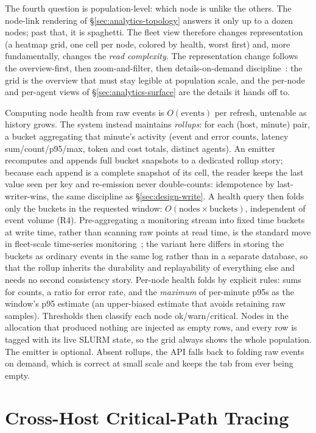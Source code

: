 The fourth question is population-level: which node is unlike the
others. The node-link rendering of \S\ref{sec:analytics-topology} answers
it only up to a dozen nodes; past that, it is spaghetti. The fleet view
therefore changes representation (a heatmap grid, one cell per node,
colored by health, worst first) and, more fundamentally, changes the
\emph{read complexity}. The representation change follows the
overview-first, then zoom-and-filter, then details-on-demand
discipline~\cite{shneiderman1996eyes}: the grid is the overview that must
stay legible at population scale, and the per-node and per-agent views of
\S\ref{sec:analytics-surface} are the details it hands off to.

Computing node health from raw events is $O(\text{events})$ per refresh,
untenable as history grows. The system instead maintains
\emph{rollups}: for each (host, minute) pair, a bucket aggregating that
minute's activity (event and error counts, latency sum/count/p95/max,
token and cost totals, distinct agents). An emitter recomputes and appends
full bucket snapshots to a dedicated rollup story; because each append is a
complete snapshot of its cell, the reader keeps the last value seen per key
and re-emission never double-counts: idempotence by
last-writer-wins, the same discipline as \S\ref{sec:design-write}. A
health query then folds only the buckets in the requested window:
$O(\text{nodes} \times \text{buckets})$, independent of event volume (R4).
Pre-aggregating a monitoring stream into fixed time buckets at write time,
rather than scanning raw points at read time, is the standard move in
fleet-scale time-series monitoring~\cite{pelkonen2015gorilla}; the variant
here differs in storing the buckets as ordinary events in the same log
rather than in a separate database, so that the rollup inherits the
durability and replayability of everything else and needs no second
consistency story.
Per-node health folds by explicit rules: sums for counts, a ratio for
error rate, and the \emph{maximum} of per-minute p95s as the
window's p95 estimate (an upper-biased estimate that avoids retaining raw
samples). Thresholds then classify each node ok/warn/critical. Nodes in
the allocation that produced nothing are injected as empty rows, and every
row is tagged with its live SLURM state, so the grid always shows the
whole population. The emitter is optional. Absent rollups, the API falls
back to folding raw events on demand, which is correct at small scale and
keeps the tab from ever being empty.

\section{Cross-Host Critical-Path Tracing}
\label{sec:analytics-tracing}

